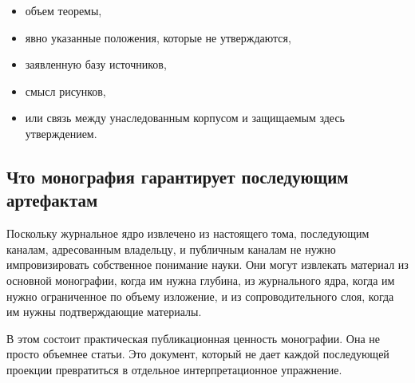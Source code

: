 \begin{itemize}
\item объем теоремы,
\item явно указанные положения, которые не утверждаются,
\item заявленную базу источников,
\item смысл рисунков,
\item или связь между унаследованным корпусом и защищаемым здесь утверждением.
\end{itemize}

\subsection{Что монография гарантирует последующим артефактам}

Поскольку журнальное ядро извлечено из настоящего тома, последующим каналам, адресованным владельцу, и
публичным каналам не нужно импровизировать собственное понимание науки.
Они могут извлекать материал из основной монографии, когда им нужна глубина, из журнального ядра, когда им нужно
ограниченное по объему изложение, и из сопроводительного слоя, когда им нужны подтверждающие материалы.

В этом состоит практическая публикационная ценность монографии.
Она не просто объемнее статьи.
Это документ, который не дает каждой последующей проекции превратиться в отдельное интерпретационное
упражнение.

\clearpage
